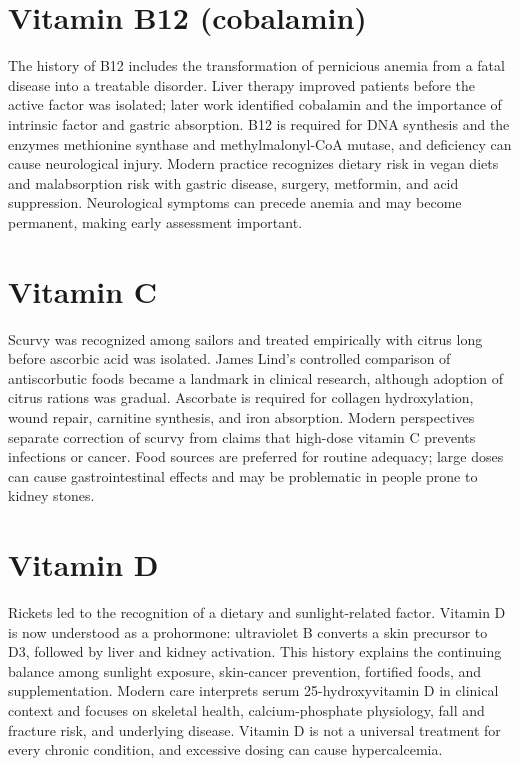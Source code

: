 \section{Vitamin B12 (cobalamin)}
The history of B12 includes the transformation of pernicious anemia from a fatal disease into a treatable disorder. Liver therapy improved patients before the active factor was isolated; later work identified cobalamin and the importance of intrinsic factor and gastric absorption. B12 is required for DNA synthesis and the enzymes methionine synthase and methylmalonyl-CoA mutase, and deficiency can cause neurological injury. Modern practice recognizes dietary risk in vegan diets and malabsorption risk with gastric disease, surgery, metformin, and acid suppression. Neurological symptoms can precede anemia and may become permanent, making early assessment important. \cite{historyNutrition,odsB12}

\section{Vitamin C}
Scurvy was recognized among sailors and treated empirically with citrus long before ascorbic acid was isolated. James Lind's controlled comparison of antiscorbutic foods became a landmark in clinical research, although adoption of citrus rations was gradual. Ascorbate is required for collagen hydroxylation, wound repair, carnitine synthesis, and iron absorption. Modern perspectives separate correction of scurvy from claims that high-dose vitamin C prevents infections or cancer. Food sources are preferred for routine adequacy; large doses can cause gastrointestinal effects and may be problematic in people prone to kidney stones. \cite{historyNutrition,odsC}

\section{Vitamin D}
Rickets led to the recognition of a dietary and sunlight-related factor. Vitamin D is now understood as a prohormone: ultraviolet B converts a skin precursor to D3, followed by liver and kidney activation. This history explains the continuing balance among sunlight exposure, skin-cancer prevention, fortified foods, and supplementation. Modern care interprets serum 25-hydroxyvitamin D in clinical context and focuses on skeletal health, calcium-phosphate physiology, fall and fracture risk, and underlying disease. Vitamin D is not a universal treatment for every chronic condition, and excessive dosing can cause hypercalcemia. \cite{historyNutrition,odsD,vitaminDMetabolism}

